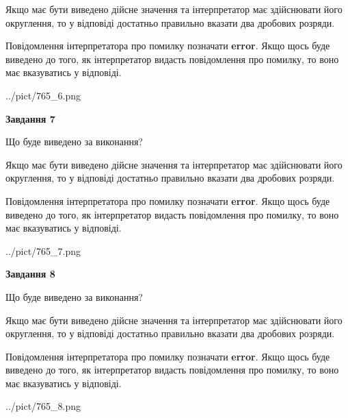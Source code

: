 \documentclass[12pt, ukrainian]{article}
\begin{document}
{\begin {Large}
Якщо має бути виведено дійсне значення та інтерпретатор має здійснювати його округлення, 
то у відповіді достатньо правильно вказати два дробових розряди.

Повідомлення інтерпретатора про помилку позначати \textbf{error}.
Якщо щось буде виведено до того, як інтерпретатор видасть повідомлення про помилку, 
то воно має вказуватись у відповіді. \par

\begin{center}
	{../pict/765_6.png}
\end{center}
\newpage

{\begin {center}\textbf{Завдання 7}\end {center}}\par
Що буде виведено за виконання? \par

Якщо має бути виведено дійсне значення та інтерпретатор має здійснювати його округлення, 
то у відповіді достатньо правильно вказати два дробових розряди.

Повідомлення інтерпретатора про помилку позначати \textbf{error}.
Якщо щось буде виведено до того, як інтерпретатор видасть повідомлення про помилку, 
то воно має вказуватись у відповіді. \par

\begin{center}
	{../pict/765_7.png}
\end{center}
\newpage

{\begin {center}\textbf{Завдання 8}\end {center}}\par
Що буде виведено за виконання? \par

Якщо має бути виведено дійсне значення та інтерпретатор має здійснювати його округлення, 
то у відповіді достатньо правильно вказати два дробових розряди.

Повідомлення інтерпретатора про помилку позначати \textbf{error}.
Якщо щось буде виведено до того, як інтерпретатор видасть повідомлення про помилку, 
то воно має вказуватись у відповіді. \par

\begin{center}
	{../pict/765_8.png}
\end{center}
\newpage


\end{Large}}
\end{document}
